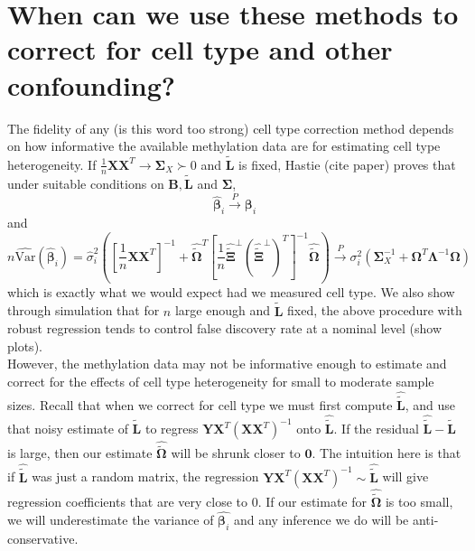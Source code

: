 \documentclass{article}
\begin{document}
\section{When can we use these methods to correct for cell type and other confounding?}
The fidelity of any (is this word too strong) cell type correction method depends on how informative the available methylation data are for estimating cell type heterogeneity. If $\frac{1}{n}\bm{X}\bm{X}^T \to \bm{\Sigma}_{X} \succ 0$ and $\bm{\tilde{L}}$ is fixed, Hastie (cite paper) proves that under suitable conditions on $\bm{B}, \bm{\tilde{L}}$ and $\bm{\Sigma}$,
\begin{equation}
\hat{\bm{\beta}}_i \stackrel{P}{\to} \bm{\beta}_i
\end{equation}
and
\begin{equation}
n\hat{\text{Var}}\left( \hat{\bm{\beta}}_i \right) = \hat{\sigma}_i^2 \left( \left[ \frac{1}{n}\bm{X}\bm{X}^T \right]^{-1} + \hat{\tilde{\bm{\Omega}}}^T\left[ \frac{1}{n}\hat{\tilde{\bm{\Xi}}}^{\perp}\left( \hat{\tilde{\bm{\Xi}}}^{\perp} \right)^T \right]^{-1} \hat{\tilde{\bm{\Omega}}} \right) \stackrel{P}{\to} \sigma_i^2 \left( \bm{\Sigma}_X^{-1} + \bm{\Omega}^T \bm{\Lambda}^{-1} \bm{\Omega} \right)
\end{equation}
which is exactly what we would expect had we measured cell type. We also show through simulation that for $n$ large enough and $\bm{\tilde{L}}$ fixed, the above procedure with robust regression tends to control false discovery rate at a nominal level (show plots).\\
\indent However, the methylation data may not be informative enough to estimate and correct for the effects of cell type heterogeneity for small to moderate sample sizes. Recall that when we correct for cell type we must first compute $\hat{\bm{\tilde{L}}}$, and use that noisy estimate of $\bm{\tilde{L}}$ to regress $\bm{Y}\bm{X}^T \left( \bm{X}\bm{X}^T \right)^{-1}$ onto $\hat{\bm{\tilde{L}}}$. If the residual $\hat{\bm{\tilde{L}}} - \bm{\tilde{L}}$ is large, then our estimate $\hat{\tilde{\bm{\Omega}}}$ will be shrunk closer to $\bm{0}$. The intuition here is that if $\hat{\bm{\tilde{L}}}$ was just a random matrix, the regression $\bm{Y}\bm{X}^T \left( \bm{X}\bm{X}^T \right)^{-1} \sim \hat{\bm{\tilde{L}}}$ will give regression coefficients that are very close to 0. If our estimate for $\hat{\tilde{\bm{\Omega}}}$ is too small, we will underestimate the variance of $\hat{\bm{\beta}_i}$ and any inference we do will be anti-conservative.\\
\end{document}
